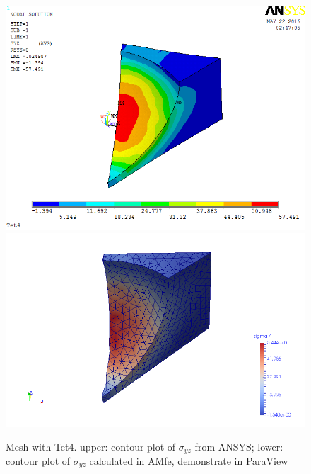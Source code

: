\begin{figure}[htbp]
	\begin{center}
		\includegraphics[width=13cm,clip]{Tet4Syz.png} 		
		\includegraphics[width=13cm,clip]{Tet4SyzP.png} 		
		\caption{Mesh with Tet4. upper: contour plot of $\sigma_{yz}$ from ANSYS; lower: contour plot of $\sigma_{yz}$ calculated in AMfe, demonstrate in ParaView} \label{fig: Tet4Syz}
	\end{center}
\end{figure}
\clearpage 

